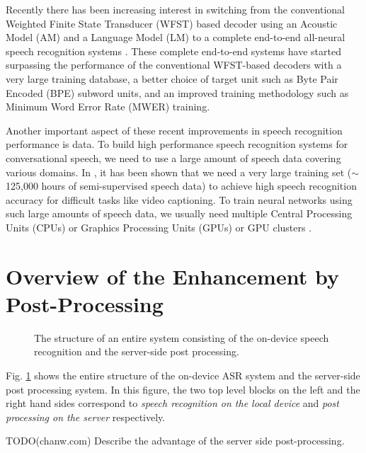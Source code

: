 \documentclass{article}
\begin{document}
Recently there has been increasing interest in switching
from the conventional Weighted Finite State Transducer (WFST)
based decoder using an Acoustic Model (AM) and a Language Model (LM)
to a complete end-to-end all-neural speech recognition systems
\cite{w_chan_icassp_2016_00, r_prabhavalkar_interspeech_2017_00,
j_chorowski_nips_2015_00}.
These complete end-to-end systems have started surpassing the performance of
the conventional WFST-based decoders with a very large training
database, a better choice of target unit such as Byte Pair Encoded (BPE)
subword units, and an improved training methodology such as Minimum
Word Error Rate (MWER) training.

Another important aspect of these recent improvements in speech
recognition performance is data.
To build high performance speech recognition systems for
conversational speech, we need to use
a large amount of speech data covering various domains. In
\cite{h_soltau_interspeech_2017_00}, it has been shown
that we need a very large training set ($\sim$125,000 hours of
semi-supervised speech data) to achieve
high speech recognition accuracy for difficult tasks like
video captioning. To train neural networks using such large
amounts of speech data, we usually need
multiple Central Processing Units (CPUs) or Graphics
Processing Units (GPUs) or GPU clusters
\cite{E_Variani_INTERSPEECH_2017_01, p_goyal_arxiv_2018_00}.




\section{Overview of the Enhancement by Post-Processing}

\begin{figure}
  \centering
    \centering
    \resizebox{130mm}{!}{
      
    }
    \caption {
      The structure of an entire system consisting of the on-device speech 
      recognition and the server-side post processing. 
      \label{fig:entire_system}
    }
\end{figure}


Fig. \ref{fig:entire_system} shows the entire structure of the on-device ASR
system and the server-side post processing system. In this figure,  
the two top level blocks on the left and the right hand sides correspond
to {\it speech recognition on the local device} and 
{\it post processing on the server} respectively.  

TODO(chanw.com) Describe the advantage of the server side post-processing.
\end{document}
